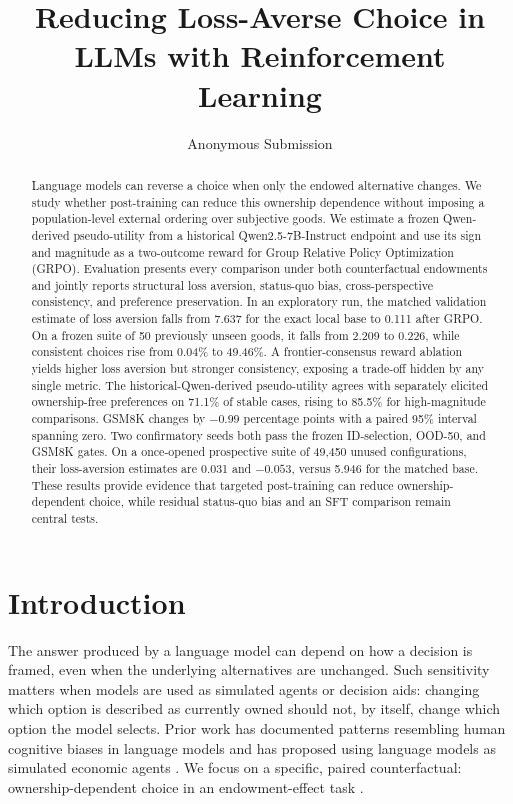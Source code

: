 \documentclass[letterpaper]{article} %
\title{Reducing Loss-Averse Choice in LLMs with Reinforcement Learning}
\author{Anonymous Submission}
\begin{document}
\maketitle

\begin{abstract}
Language models can reverse a choice when only the endowed alternative changes.
We study whether post-training can reduce this ownership dependence without
imposing a population-level external ordering over subjective goods. We estimate a
frozen Qwen-derived pseudo-utility from a historical Qwen2.5-7B-Instruct
endpoint and use its sign and magnitude as a two-outcome reward for Group Relative Policy Optimization
(GRPO). Evaluation presents every comparison under both counterfactual
endowments and jointly reports structural loss aversion, status-quo bias,
cross-perspective consistency, and preference preservation. In an exploratory
run, the matched validation estimate of loss aversion falls from 7.637 for the
exact local base to 0.111 after GRPO. On a frozen suite of 50 previously unseen
goods, it falls from 2.209 to 0.226, while consistent choices rise from 0.04\%
to 49.46\%. A frontier-consensus reward ablation yields higher loss aversion
but stronger consistency, exposing a trade-off hidden by any single metric.
The historical-Qwen-derived pseudo-utility agrees with separately elicited
ownership-free preferences on 71.1\% of stable cases, rising to 85.5\% for
high-magnitude comparisons. GSM8K changes by $-0.99$ percentage points with a
paired 95\% interval spanning zero. Two confirmatory seeds both pass the frozen
ID-selection, OOD-50, and GSM8K gates. On a once-opened prospective suite of
49,450 unused configurations, their loss-aversion estimates are 0.031 and
$-0.053$, versus 5.946 for the matched base. These results provide evidence
that targeted post-training can reduce ownership-dependent choice, while
residual status-quo bias and an SFT comparison remain central tests.
\end{abstract}

\section{Introduction}

The answer produced by a language model can depend on how a decision is
framed, even when the underlying alternatives are unchanged. Such sensitivity
matters when models are used as simulated agents or decision aids: changing
which option is described as currently owned should not, by itself, change
which option the model selects. Prior work has documented patterns resembling
human cognitive biases in language models \citep{jones2022capturing,
itzhak2024instructed, echterhoff2024cognitive} and has proposed using language
models as simulated economic agents \citep{horton2023homo}. We focus on a
specific, paired counterfactual: ownership-dependent choice in an
endowment-effect task \citep{kahneman1990endowment,tversky1991loss,
samuelson1988statusquo}.
\end{document}
